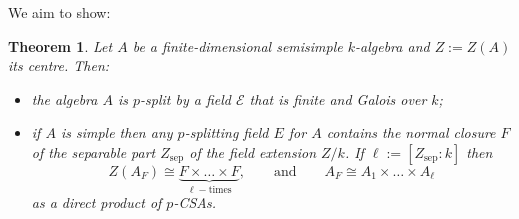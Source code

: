 \documentclass[11pt,reqno]{amsart}
\newtheorem{theorem}[lemma]{Theorem}
\theoremstyle{definition}
\theoremstyle{remark}
\theoremstyle{definition}
\theoremstyle{plain}
\newcommand{\sep}{\mathrm{sep}}
\begin{document}
We aim to show:

\begin{theorem}
 Let $A$ be a finite-dimensional semisimple $k$-algebra and $Z:=Z(A)$ its centre. Then: 
\begin{itemize}
\item[(i)] the algebra $A$ is $p$-split by a field $\mathscr{E}$ that is finite and Galois over $k$;
\item[(ii)] if $A$ is simple then any $p$-splitting field $E$ for $A$ contains the normal closure $F$ of the separable part $Z_\sep$ of the field extension $Z/k$. If $\ell:=[Z_\sep:k]$ then $$Z(A_F)\cong \underbrace{F\times\dots\times F}_{\ell-\text{times}},\qquad\text{and}\qquad A_F\cong A_1\times\dots\times A_\ell$$ as a direct product of $p$-CSAs. 
\end{itemize}
\end{theorem}
\end{document}
